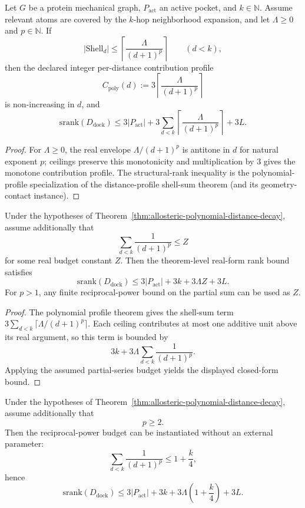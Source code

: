 \begin{theorem}\label{thm:allosteric-polynomial-distance-decay}
Let $G$ be a protein mechanical graph, $P_{\mathrm{act}}$ an active pocket, and $k\in\mathbb{N}$. Assume relevant atoms are covered by the $k$-hop neighborhood expansion, and let $\Lambda\ge 0$ and $p\in\mathbb{N}$. If
\[
\bigl|\mathrm{Shell}_d\bigr|
\le
\left\lceil \frac{\Lambda}{(d+1)^p} \right\rceil
\qquad (d<k),
\]
then the declared integer per-distance contribution profile
\[
C_{\mathrm{poly}}(d):=3\left\lceil \frac{\Lambda}{(d+1)^p} \right\rceil
\]
is non-increasing in $d$, and
\[
\mathrm{srank}(D_{\mathrm{dock}})
\le
3|P_{\mathrm{act}}| + 3\sum_{d<k}\left\lceil \frac{\Lambda}{(d+1)^p} \right\rceil + 3L.
\]
\end{theorem}

\begin{proof}
For $\Lambda\ge 0$, the real envelope $\Lambda/(d+1)^p$ is antitone in $d$ for natural exponent $p$; ceilings preserve this monotonicity and multiplication by $3$ gives the monotone contribution profile. The structural-rank inequality is the polynomial-profile specialization of the distance-profile shell-sum theorem (and its geometry-contact instance).
\end{proof}

\begin{theorem}\label{thm:allosteric-polynomial-series-budget}
Under the hypotheses of Theorem~\ref{thm:allosteric-polynomial-distance-decay}, assume additionally that
\[
\sum_{d<k}\frac{1}{(d+1)^p} \le Z
\]
for some real budget constant $Z$. Then the theorem-level real-form rank bound satisfies
\[
\mathrm{srank}(D_{\mathrm{dock}})
\le
3|P_{\mathrm{act}}| + 3k + 3\Lambda Z + 3L.
\]
For $p>1$, any finite reciprocal-power bound on the partial sum can be used as $Z$.
\end{theorem}

\begin{proof}
The polynomial profile theorem gives the shell-sum term $3\sum_{d<k}\lceil\Lambda/(d+1)^p\rceil$. Each ceiling contributes at most one additive unit above its real argument, so this term is bounded by
\[
3k + 3\Lambda\sum_{d<k}\frac{1}{(d+1)^p}.
\]
Applying the assumed partial-series budget yields the displayed closed-form bound.
\end{proof}

\begin{theorem}\label{thm:allosteric-polynomial-series-explicit}
Under the hypotheses of Theorem~\ref{thm:allosteric-polynomial-distance-decay}, assume additionally that
\[
p\ge 2.
\]
Then the reciprocal-power budget can be instantiated without an external parameter:
\[
\sum_{d<k}\frac{1}{(d+1)^p}
\le
1 + \frac{k}{4},
\]
hence
\[
\mathrm{srank}(D_{\mathrm{dock}})
\le
3|P_{\mathrm{act}}| + 3k + 3\Lambda\left(1+\frac{k}{4}\right) + 3L.
\]
\end{theorem}

